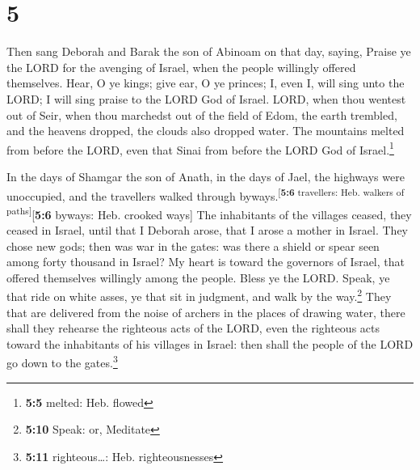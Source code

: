 \hypertarget{section-4}{%
\section{5}\label{section-4}}

 Then sang Deborah and Barak the son of Abinoam on that
day, saying,  Praise ye the LORD for the avenging of
Israel, when the people willingly offered themselves. 
Hear, O ye kings; give ear, O ye princes; I, even I, will sing unto the
LORD; I will sing praise to the LORD God of Israel.  LORD,
when thou wentest out of Seir, when thou marchedst out of the field of
Edom, the earth trembled, and the heavens dropped, the clouds also
dropped water.  The mountains melted from before the LORD,
even that Sinai from before the LORD God of Israel.\footnote{\textbf{5:5}
  melted: Heb. flowed}

 In the days of Shamgar the son of Anath, in the days of
Jael, the highways were unoccupied, and the travellers walked through
byways.\textsuperscript{{[}\textbf{5:6} travellers: Heb. walkers of
paths{]}}{[}\textbf{5:6} byways: Heb. crooked ways{]}  The
inhabitants of the villages ceased, they ceased in Israel, until that I
Deborah arose, that I arose a mother in Israel.  They
chose new gods; then was war in the gates: was there a shield or spear
seen among forty thousand in Israel?  My heart is toward
the governors of Israel, that offered themselves willingly among the
people. Bless ye the LORD.  Speak, ye that ride on white
asses, ye that sit in judgment, and walk by the way.\footnote{\textbf{5:10}
  Speak: or, Meditate}  They that are delivered from the
noise of archers in the places of drawing water, there shall they
rehearse the righteous acts of the LORD, even the righteous acts toward
the inhabitants of his villages in Israel: then shall the people of the
LORD go down to the gates.\footnote{\textbf{5:11} righteous\ldots: Heb.
  righteousnesses}

